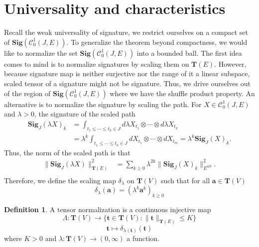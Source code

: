 \documentclass[12pt]{report}
\theoremstyle{definition}
\newtheorem{definition}[theorem]{Definition}
\theoremstyle{remark}
\begin{document}
\section{Universality and characteristics }
Recall the weak universality of signature, we restrict ourselves on a compact set of $\mathbf{Sig}(\mathcal{C}^{1}_{0}(J,E))$. To generalize the theorem beyond compactness, we would like to normalize the set $\mathbf{Sig}(\mathcal{C}^{1}_{0}(J,E))$ into a bounded ball. The first idea comes to mind is to normalize signatures by scaling them on $\mathbf{T}(E)$. However, because signature map is neither surjective nor the range of it a linear subspace, scaled tensor of a signature might not be signature. Thus, we drive ourselves out of the region of $\mathbf{Sig}(\mathcal{C}^{1}_{0}(J,E))$ where we have the shuffle product property. An alternative is to normalize the signature by scaling the path. For $X \in \mathcal{C}^{1}_{0}(J,E)$ and $\lambda > 0$, the signature of the scaled path
\begin{equation}
  \begin{split}
    \mathbf{Sig}_{J}(\lambda X)_{k} &= \int_{t_{1}\leq\cdots\leq t_{k} \in J}d\lambda X_{t_{1}}\otimes\cdots\otimes d\lambda  X_{t_{k}}\\ 
    &= \lambda^{k}\int_{t_{1}\leq\cdots\leq t_{k} \in J}dX_{t_{1}}\otimes\cdots\otimes dX_{t_{m}} = \lambda^{k}\mathbf{Sig}_{J}(X)_{k}.
  \end{split}
\end{equation}
Thus, the norm of the scaled path is that 
\begin{equation}
  \begin{split}
    \big\lVert \mathbf{Sig}_{J}(\lambda X)\big\rVert_{\mathbf{T}(E)}^{2} &= \sum_{k\geq 0} \lambda^{2k} \lVert \mathbf{Sig}_{J}(X)_{k}\rVert_{E^{\otimes k}}^{2}. \\
  \end{split}
\end{equation}
Therefore, we define the scaling map $\delta_{\lambda}$ on $\mathbf{T}(V)$ such that for all $\mathbf{a} \in \mathbf{T}(V)$ 
\begin{equation}
  \delta_{\lambda}(\mathbf{a}) = (\lambda^{k} \mathbf{a}^{k})_{k\geq 0}
\end{equation} 
\begin{definition}
  A tensor normalization is a continuous injective map 
  \begin{equation}
    \Lambda\colon \mathbf{T}(V) \to \{\mathbf{t} \in \mathbf{T}(V)\colon \lVert\mathbf{t}\rVert_{\mathbf{T}(E)} \leq K\}
  \end{equation}
  \begin{equation}
    \mathbf{t} \mapsto \delta_{\lambda(\mathbf{t} )}(\mathbf{t} )
  \end{equation}
  where $K > 0$ and $\lambda\colon \mathbf{T}(V) \to (0,\infty)$ a function. 
\end{definition}
\end{document}
